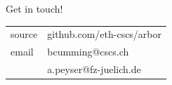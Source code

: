 \documentclass[a0paper,portrait]{baposter}
\begin{document}
\begin{poster}
\begin{posterbox}[name=contact,column=2,below=plots,span=1,headerColorOne=blue!40!black,headerFontColor=white]{Get in touch!}
    \colorbox[HTML]{FCF3CF}{%
        \begin{tabularx}{0.95\textwidth}{l|X}
            source& {github.com/eth-cscs/arbor}\smallskip\\
            email & {bcumming@cscs.ch}\\
                  & {a.peyser@fz-juelich.de}\smallskip\\
        \end{tabularx}
    }
\end{posterbox}

\end{poster}
\end{document}
